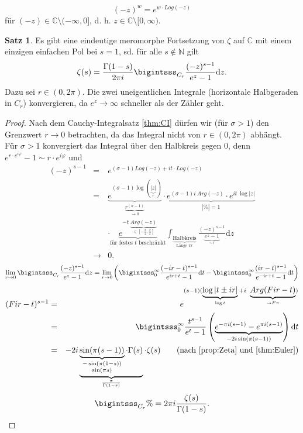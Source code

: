 \documentclass[11pt,titlepage]{article}
\theoremstyle{definition}
\newtheorem{theorem}{Satz}[section]
\theoremstyle{remark}
\begin{document}
	
	
	
	\[(-z)^w =e^{w\cdot Log(-z)} \]
	für $(-z)\in\mathbb{C}\setminus (-\infty,0]$, d. h. $z\in\mathbb{C}\setminus [0,\infty)$.
	
	\begin{theorem}
		Es gibt eine eindeutige meromorphe Fortsetzung von $\zeta$ auf $\mathbb{C}$ mit einem einzigen einfachen 
		Pol bei $s=1$, sd. für alle $s\notin\mathbb{N}$ gilt
		\[ \zeta(s) =\frac{\Gamma(1-s)}{2\pi i} \bigintsss_{C_r} \frac{(-z)^{s-1}}{e^z -1}\mathrm{d}z. \]
		Dazu sei $r\in (0,2\pi)$. Die zwei uneigentlichen Integrale (horizontale Halbgeraden in $C_r$) konvergieren, 
		da $e^z\to\infty$ schneller als der Zähler geht.
	\end{theorem}
	
	\begin{proof}
		Nach dem Cauchy-Integralsatz \ref{thm:CI} dürfen wir (für $\sigma>1$) den Grenzwert $r\to0$ betrachten, 
		da das Integral nicht von $r\in(0,2\pi)$ abhängt. \\
		Für $\sigma>1$ konvergiert das Integral über den Halbkreis gegen $0$, denn $e^{r\cdot e^{i\varphi}}-1
		\sim r\cdot e^{i\varphi}$ und
		\begin{eqnarray*}
			(-z)^{s-1} &=& e^{(\sigma -1)Log(-z)+it\cdot Log(-z)} \\ &=&
			\underbrace{e^{(\sigma -1)\log( \underbrace{|z|}_r)}}_{\underbrace{r^{(\sigma -1)}}_{\to0}} \cdot 
			\underbrace{e^{(\sigma -1) i\ Arg(-z)}\cdot e^{it\ \log |z|}}_{|\%|=1}\\
			&\quad&\cdot \underbrace{e^{-t\ \underbrace{Arg(-z)}_{\in [-\frac{\pi}{2},\frac{\pi}{2}]}}}_
			{\text{für festes $t$ beschränkt}} \int_{\underbrace{\text{Halbkreis}}_{\text{Länge $\pi r$}}} 
			\frac{(-z)^{s-1}}{\underbrace{e^z -1}_{\sim r}}\mathrm{d}z \\
			&\to& 0.
		\end{eqnarray*}
		\begin{eqnarray*}
			\lim_{r\to 0} \bigintsss_{C_r} \frac{(-z)^{s-1}}{e^z -1}\mathrm{d}z =
			\lim_{r\to 0} \left( \bigintsss_0^{\infty} \frac{(-ir-t)^{s-1}}{e^{ir+t}-1}\mathrm{d}t -\bigintsss_0^{\infty} 
			\frac{(ir-t)^{s-1}}{e^{-ir+t}-1}\mathrm{d}t\right) \\
		\end{eqnarray*}
		\begin{align*}
			(Fir-t)^{s-1} &=&e^{(s-1)(\underbrace{\log |t\pm ir|}_{\log t}+i\ \underbrace{Arg(Fir-t)}_{\to F\pi})} \\
			&=& \bigintsss_0^{\infty} \frac{t^{s-1}}{e^t-1}\left(\underbrace{ e^{-\pi i(s-1)}-e^{\pi i(s-1)}}_{-2i\sin(\pi(s-1))}
			\right)
			\mathrm{d}t \\
			&=& -2 i\underbrace{\underbrace{\sin(\pi(s-1))}_{\genfrac{}{}{0pt}{1}{-\sin(\pi(1-s))}{\sin(\pi s)}} \cdot 
			\Gamma(s) }_{\frac{\pi}{\Gamma(1-s)}}\cdot \zeta(s) \tag{\text{nach \ref{prop:Zeta} und \ref{thm:Euler}}}
		\end{align*}
		\[ \bigintsss_{C_r}\% = 2\pi i \frac{\zeta(s)}{\Gamma(1-s)}. \]
		

\end{proof}
\end{document}
